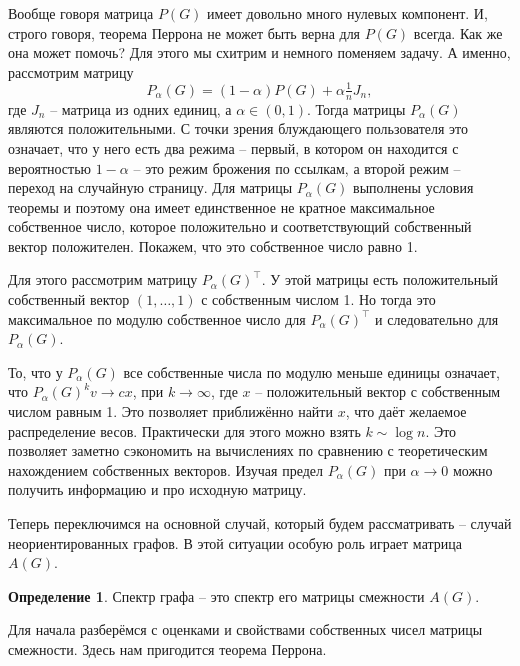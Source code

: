 \documentclass[10pt,a4paper,oneside]{book}
\theoremstyle{definition}
\newtheorem*{defn}{{\color{yellow!30!red} Определение}}
\def\dfn{\begin{defn}}
\def\edfn{\end{defn}}
\begin{document}
Вообще говоря матрица $P(G)$ имеет довольно много нулевых компонент. И, строго говоря, теорема Перрона не может быть верна для $P(G)$ всегда. Как же она может помочь? Для этого мы схитрим и немного поменяем задачу. А именно, рассмотрим матрицу $$P_{\alpha}(G)=(1-\alpha) P(G) + \alpha\tfrac{1}{n}J_n,$$
где $J_n$ -- матрица из одних единиц, а $\alpha \in (0,1)$. Тогда матрицы $P_{\alpha}(G)$ являются положительными. С точки зрения блуждающего пользователя это означает, что у него есть два режима -- первый, в котором он находится с вероятностью $1-\alpha$ -- это режим брожения по ссылкам, а второй режим -- переход на случайную страницу. Для матрицы $P_{\alpha}(G)$ выполнены условия теоремы и поэтому она имеет единственное не кратное максимальное собственное число, которое положительно и соответствующий собственный вектор положителен. Покажем, что это собственное число равно 1.

Для этого рассмотрим матрицу $P_{\alpha}(G)^{\top}$. У этой матрицы есть положительный собственный вектор $(1,\dots,1)$ с собственным числом 1. Но тогда это максимальное по модулю собственное число для $P_{\alpha}(G)^{\top}$ и следовательно для $P_{\alpha}(G)$. 

То, что у $P_{\alpha}(G)$ все собственные числа по модулю меньше единицы означает, что $P_{\alpha}(G)^kv \to cx$, при $k \to \infty$, где $x$ -- положительный вектор с собственным числом равным 1. Это позволяет приближённо найти $x$, что даёт желаемое распределение весов. Практически для этого можно взять $k\sim \log n$. Это позволяет заметно сэкономить на вычислениях по сравнению с теоретическим нахождением собственных векторов. Изучая предел $P_{\alpha}(G)$ при $\alpha \to 0$ можно получить информацию и про исходную матрицу.


Теперь переключимся на основной случай, который будем рассматривать -- случай неориентированных графов. В этой ситуации особую роль играет матрица $A(G)$.


\dfn Спектр графа -- это спектр его матрицы смежности $A(G)$.
\edfn


Для начала разберёмся с оценками и свойствами собственных чисел матрицы смежности. Здесь нам пригодится теорема Перрона. 
\end{document}
